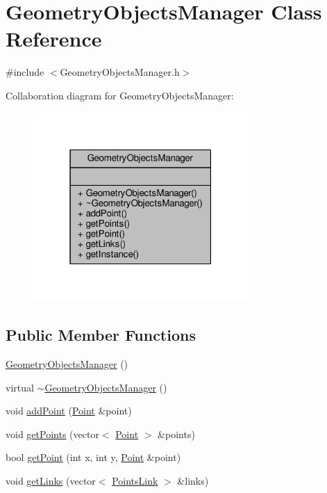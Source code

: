 \hypertarget{class_geometry_objects_manager}{\section{Geometry\-Objects\-Manager Class Reference}
\label{class_geometry_objects_manager}
}


{\ttfamily \#include $<$Geometry\-Objects\-Manager.\-h$>$}



Collaboration diagram for Geometry\-Objects\-Manager\-:
\nopagebreak
\begin{figure}[H]
\begin{center}
\leavevmode
\includegraphics[width=232pt]{class_geometry_objects_manager__coll__graph}
\end{center}
\end{figure}
\subsection*{Public Member Functions}
\begin{DoxyCompactItemize}
\item 
\hyperlink{class_geometry_objects_manager_ac1847098c6290faaef1f64b1bb9f7163}{Geometry\-Objects\-Manager} ()
\item 
virtual \hyperlink{class_geometry_objects_manager_a4fe85a06b6810491f953b0463692e8e8}{$\sim$\-Geometry\-Objects\-Manager} ()
\item 
void \hyperlink{class_geometry_objects_manager_ab929b8e262f10bc34cf8f296794f19c2}{add\-Point} (\hyperlink{class_point}{Point} \&point)
\item 
void \hyperlink{class_geometry_objects_manager_a7023c883729a9301d4e11a3bce43f8dd}{get\-Points} (vector$<$ \hyperlink{class_point}{Point} $>$ \&points)
\item 
bool \hyperlink{class_geometry_objects_manager_a4c9b1d61333a56175336d6d12f9e0b0c}{get\-Point} (int x, int y, \hyperlink{class_point}{Point} \&point)
\item 
void \hyperlink{class_geometry_objects_manager_af6ec7cbc6947a1fe9d32861cefb3515e}{get\-Links} (vector$<$ \hyperlink{class_points_link}{Points\-Link} $>$ \&links)
\end{DoxyCompactItemize}
